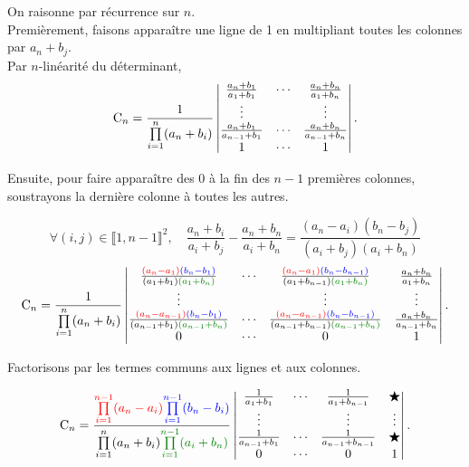 \begin{preuve}
    On raisonne par récurrence sur $n$. \\
    Premièrement, faisons apparaître une ligne de 1 en multipliant toutes les colonnes par $a_n+b_j$. \\
    Par $n$-linéarité du déterminant,
    $$\mathrm{C}_n = \frac{1}{\prod\limits_{i=1}^{n}(a_n + b_i)} \begin{vmatrix}
        \frac{a_n+b_1}{a_1+b_1} & \cdots & \frac{a_n+b_n}{a_1+b_n} \\
        \vdots & & \vdots \\
        \frac{a_n+b_1}{a_{n-1}+b_1} & \cdots & \frac{a_n+b_n}{a_{n-1}+b_n} \\
        1 & \cdots & 1
    \end{vmatrix}.$$
    
    Ensuite, pour faire apparaître des 0 à la fin des $n-1$ premières colonnes, soustrayons la dernière colonne à toutes les autres. 
    
    $$
        \forall (i,j) \in \llbracket 1, n-1 \rrbracket^2, \quad \frac{a_n+b_i}{a_i+b_j} - \frac{a_n+b_n}{a_i+b_n} = \frac{(a_n - a_i)(b_n-b_j)}{(a_i + b_j)(a_i + b_n)}
    $$
    $$\Cauchy_n = \frac{1}{\prod\limits_{i=1}^{n}(a_n + b_i)} \begin{vmatrix}
        \frac{\textcolor{red}{(a_n - a_1)}\textcolor{blue}{(b_n-b_1)}}{(a_1 + b_1) \textcolor{green}{(a_1 + b_n)}} & \cdots & \frac{\textcolor{red}{(a_n - a_1)}\textcolor{blue}{(b_n-b_{n-1})}}{(a_1 + b_{n-1})\textcolor{green}{(a_1 + b_n)}} & \frac{a_n+b_n}{a_1+b_n} \\
        \vdots & & \vdots & \vdots \\
        \frac{\textcolor{red}{(a_n - a_{n-1})}\textcolor{blue}{(b_n-b_1)}}{(a_{n-1} + b_1)\textcolor{green}{(a_{n-1} + b_n)}} & \cdots & \frac{\textcolor{red}{(a_n - a_{n-1})}\textcolor{blue}{(b_n-b_{n-1})}}{(a_{n-1} + b_{n-1})\textcolor{green}{(a_{n-1} + b_n)}} & \frac{a_n+b_n}{a_{n-1}+b_n} \\
        0 & \cdots & 0 & 1
    \end{vmatrix}.$$
        
    Factorisons par les termes communs aux lignes et aux colonnes.
        
    $$\Cauchy_n =  \frac{\textcolor{red}{\prod\limits_{i=1}^{n-1} (a_n - a_i)} \textcolor{blue}{\prod\limits_{i = 1}^{n-1}(b_n - b_i)}}{\prod\limits_{i=1}^{n}(a_n + b_i) \textcolor{green}{\prod\limits_{i = 1}^{n - 1} (a_i + b_n)}} \begin{vmatrix}
        \frac{1}{a_1+b_1} & \cdots & \frac{1}{a_1+b_{n-1}} & \bigstar \\
        \vdots & & \vdots & \vdots \\
        \frac{1}{a_{n-1}+b_1} & \cdots & \frac{1}{a_{n-1}+b_{n-1}} & \bigstar \\
        0 & \cdots & 0 & 1
    \end{vmatrix}.$$
        

\end{preuve}

